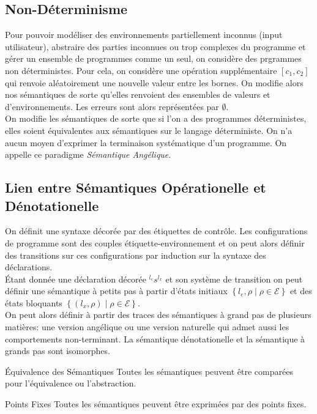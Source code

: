 \documentclass{cours}
\begin{document}
\subsection{Non-Déterminisme}
Pour pouvoir modéliser des environnements partiellement inconnus (input utilisateur), abstraire des parties inconnues ou trop complexes du programme et gérer un ensemble de programmes comme un seul, on considère des prgrammes non déterministes. Pour cela, on considère une opération supplémentaire $[c_{1}, c_{2}]$ qui renvoie aléatoirement une nouvelle valeur entre les bornes. On modifie alors nos sémantiques de sorte qu'elles renvoient des ensembles de valeurs et d'environnements. Les erreurs sont alors représentées par $\emptyset$.\\
On modifie les sémantiques de sorte que si l'on a des programmes déterministes, elles soient équivalentes aux sémantiques sur le langage déterministe. On n'a aucun moyen d'exprimer la terminaison systématique d'un programme. On appelle ce paradigme \textit{Sémantique Angélique}.

\subsection{Lien entre Sémantiques Opérationelle et Dénotationelle}
On définit une syntaxe décorée par des étiquettes de contrôle. Les configurations de programme sont des couples étiquette-environnement et on peut alors définir des transitions sur ces configurations par induction sur la syntaxe des déclarations. \\
Étant donnée une déclaration décorée $^{l_{e}}s^{l_{x}}$ et son système de transition on peut définir une sémantique à petits pas à partir d'états initiaux $\left\{l_{e}, \rho \mid \rho \in \mathcal{E}\right\}$ et des états bloquants $\left\{(l_{x}, \rho) \mid \rho \in \mathcal{E}\right\}$.\\
On peut alors définir à partir des traces des sémantiques à grand pas de plusieurs matières: une version angélique ou une version naturelle qui admet aussi les comportements non-terminant. La sémantique dénotationelle et la sémantique à grands pas sont isomorphes. 
\begin{théorème}{Équivalence des Sémantiques}{}
    Toutes les sémantiques peuvent être comparées pour l'équivalence ou l'abstraction.
\end{théorème}

\begin{théorème}{Points Fixes}{}
    Toutes les sémantiques peuvent être exprimées par des points fixes.
\end{théorème}
\end{document}
